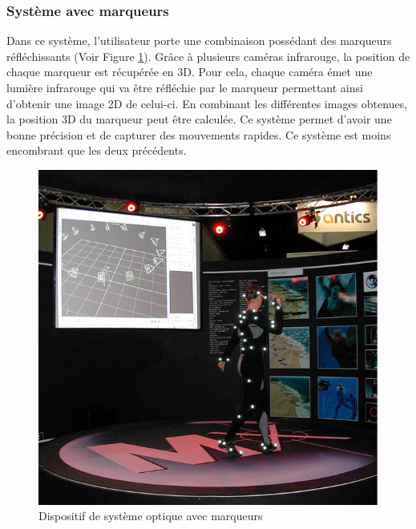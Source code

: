 \subsubsection{Système avec marqueurs}
Dans ce système, l'utilisateur porte une combinaison possédant des marqueurs réfléchissants (Voir Figure \ref{fig5}). Gr\^{a}ce à plusieurs caméras infrarouge, la position de chaque marqueur est récupérée en 3D. Pour cela, chaque caméra émet une lumière infrarouge qui va être réfléchie par le marqueur permettant ainsi d'obtenir une image 2D de celui-ci. En combinant les différentes images obtenues, la position 3D du marqueur peut être calculée. Ce système permet d'avoir une bonne précision et de capturer des mouvements rapides. Ce système est moins encombrant que les deux précédents.
\begin{figure}[!h]
   	\centerline{\includegraphics[scale=0.35]{./captureoptic}}
   	\caption{\label{fig5} Dispositif de système optique avec marqueurs}
\end{figure}
